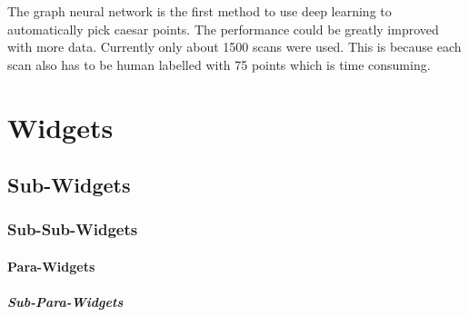 The graph neural network is the first method to use deep learning to automatically pick caesar points. The performance could be greatly improved with more data. Currently only about 1500 scans were used. This is because each scan also has to be human labelled with 75 points which is time consuming.

\section{Widgets}
\subsection{Sub-Widgets}
\subsubsection{Sub-Sub-Widgets}
\paragraph{Para-Widgets}
\subparagraph{Sub-Para-Widgets}

